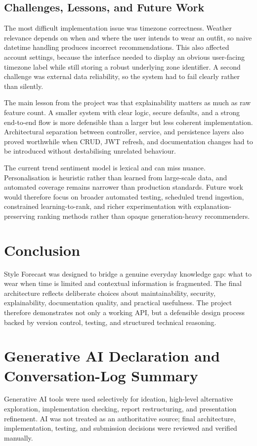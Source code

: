 \documentclass[11pt,a4paper]{article}
\begin{document}
\subsection{Challenges, Lessons, and Future Work}
The most difficult implementation issue was timezone correctness. Weather relevance depends on when and where the user intends to wear an outfit, so naive datetime handling produces incorrect recommendations. This also affected account settings, because the interface needed to display an obvious user-facing timezone label while still storing a robust underlying zone identifier. A second challenge was external data reliability, so the system had to fail clearly rather than silently.

The main lesson from the project was that explainability matters as much as raw feature count. A smaller system with clear logic, secure defaults, and a strong end-to-end flow is more defensible than a larger but less coherent implementation. Architectural separation between controller, service, and persistence layers also proved worthwhile when CRUD, JWT refresh, and documentation changes had to be introduced without destabilising unrelated behaviour.

The current trend sentiment model is lexical and can miss nuance. Personalisation is heuristic rather than learned from large-scale data, and automated coverage remains narrower than production standards. Future work would therefore focus on broader automated testing, scheduled trend ingestion, constrained learning-to-rank, and richer experimentation with explanation-preserving ranking methods rather than opaque generation-heavy recommenders.

\section{Conclusion}
Style Forecast was designed to bridge a genuine everyday knowledge gap: what to wear when time is limited and contextual information is fragmented. The final architecture reflects deliberate choices about maintainability, security, explainability, documentation quality, and practical usefulness. The project therefore demonstrates not only a working API, but a defensible design process backed by version control, testing, and structured technical reasoning.

\clearpage
\appendix
\renewcommand{\thesection}{Appendix \Alph{section}}
\section{Generative AI Declaration and Conversation-Log Summary}
Generative AI tools were used selectively for ideation, high-level alternative exploration, implementation checking, report restructuring, and presentation refinement. AI was not treated as an authoritative source; final architecture, implementation, testing, and submission decisions were reviewed and verified manually.
\end{document}
